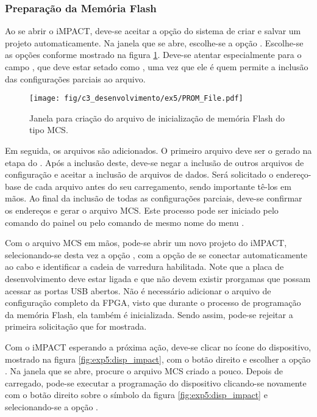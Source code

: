 \documentclass[11pt,a4paper,oneside]{book}
\begin{document}
\subsubsection{Preparação da Memória Flash}
Ao se abrir o iMPACT, deve-se aceitar a opção do sistema de criar e salvar um projeto automaticamente.
Na janela que se abre, escolhe-se a opção .
Escolhe-se as opções conforme mostrado na figura \ref{fig:ex5:prom}.
Deve-se atentar especialmente para o campo , que deve estar setado como , uma vez que ele é quem permite a inclusão das configurações parciais ao arquivo.

\begin{figure}[htp]
\centering
\texttt{[image: fig/c3\_desenvolvimento/ex5/PROM\_File.pdf]}
\caption{Janela para criação do arquivo de inicialização de memória Flash do tipo MCS.}
\label{fig:ex5:prom}
\end{figure}

Em seguida, os arquivos são adicionados.
O primeiro arquivo deve ser o  gerado na etapa do .
Após a inclusão deste, deve-se negar a inclusão de outros arquivos de configuração e aceitar a inclusão de arquivos de dados.
Será solicitado o endereço-base de cada arquivo antes do seu carregamento, sendo importante tê-los em mãos.
Ao final da inclusão de todas as configurações parciais, deve-se confirmar os endereços e gerar o arquivo MCS.
Este processo pode ser iniciado pelo comando  do painel  ou pelo comando de mesmo nome do menu .

Com o arquivo MCS em mãos, pode-se abrir um novo projeto do iMPACT, selecionando-se desta vez a opção , com a opção de se conectar automaticamente ao cabo e identificar a cadeia de varredura habilitada.
Note que a placa de desenvolvimento deve estar ligada e que não devem existir prorgamas que possam acessar as portas USB abertos.
Não é necessário adicionar o arquivo de configuração completo da FPGA, visto que durante o processo de programação da memória Flash, ela também é inicializada.
Sendo assim, pode-se rejeitar a primeira solicitação que for mostrada.

Com o iMPACT esperando a próxima ação, deve-se clicar no ícone do dispositivo, mostrado na figura \ref{fig:exp5:disp_impact}, com o botão direito e escolher a opção .
Na janela que se abre, procure o arquivo MCS criado a pouco.
Depois de carregado, pode-se executar a programação do dispositivo clicando-se novamente com o botão direito sobre o símbolo da figura \ref{fig:exp5:disp_impact} e selecionando-se a opção .
\end{document}

